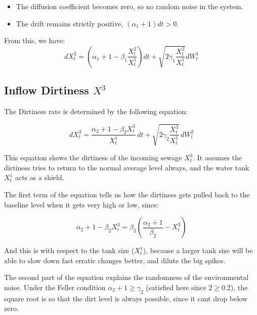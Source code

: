 \documentclass[conference]{IEEEtran}
\renewcommand{\medskip}{\vspace{1\baselineskip}}
\renewcommand{\smallskip}{\vspace{0.5\baselineskip}}
\theoremstyle{definitionsc}
\theoremstyle{plainsc}
\theoremstyle{remarksc}
\begin{document}
\begin{itemize}
	\item The diffusion coefficient becomes zero, so no random noise in the system.
	\item The drift remains strictly positive, $(\alpha_1 + 1)dt > 0$.
\end{itemize}

From this, we have:
\begin{equation}
\label{eq:Xt2}
	dX_{t}^{2}=\left(\alpha _{1}+1-\beta _{1}\frac{X_{t}^{2}}{X_{t}^{1}}\right)dt+\sqrt{2\gamma _{1}\frac{X_{t}^{2}}{X_{t}^{1}}}dW_{t}^{1}
\end{equation}







\medskip






\subsection{\textbf{Inflow Dirtiness $X^3$}}


The Dirtiness rate is determined by the following equation:

\begin{equation}
\label{eq:Xt3}
	dX_t^3 =
\frac{\alpha_2 + 1 - \beta_2 X_t^3}{X_t^1}\,dt
+
\sqrt{
2\gamma_2 \frac{X_t^3}{X_t^1}
}\,dW_t^2
\end{equation}

This equation shows the dirtiness of the incoming sewage $X_t^3$. It assumes the dirtiness tries to return to the normal average level always, and the water tank $X_t^1$ acts as a shield.

\smallskip

The first term of the equation tells us how the dirtiness gets pulled back to the baseline level when it gets very high or low, since:

\begin{equation*}
	\alpha_2 + 1 - \beta_2 X_t^3 = \beta_2\left(\frac{\alpha_2 + 1}{\beta_2} - X_t^3\right)
\end{equation*}

And this is with respect to the tank size ($X_t^1$), because a larger tank size will be able to slow down fast erratic changes better, and dilute the big spikes. 

The second part of the equation explains the randomness of the environmental noise. Under the Feller condition $\alpha_2 + 1 \geq \gamma_2$ (satisfied here since $2 \geq 0.2$), the square root is so that the dirt level is always possible, since it cant drop below zero. 
\end{document}
